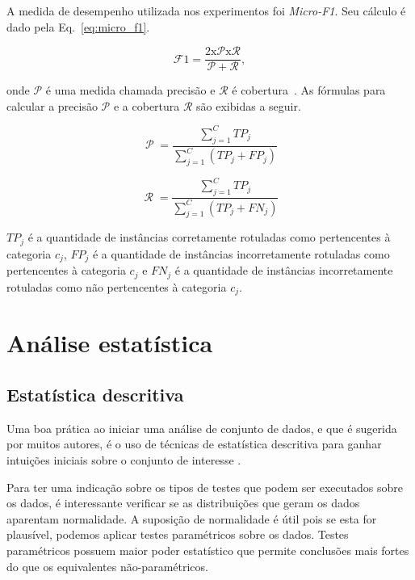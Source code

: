 \documentclass[conference]{IEEEtran}
\begin{document}
A medida de desempenho utilizada nos experimentos foi \textit{Micro-F1}.
Seu cálculo é dado pela Eq.~\ref{eq:micro_f1}.

\begin{equation}
\operatorname{\mathcal{F}{1} = \frac{2 x \mathcal{P} x \mathcal{R}}{\mathcal{P} + \mathcal{R}}},
\label{eq:micro_f1}
\end{equation}

\noindent onde $\mathcal{P}$ é uma medida chamada precisão e $\mathcal{R}$ é cobertura~\cite{chang2008multilabel}. As fórmulas para calcular a precisão $\mathcal{P}$ e a cobertura $\mathcal{R}$ são exibidas a seguir.

\begin{equation}
\operatorname{\mathcal{P}} = \frac{\sum_{j=1}^{C}TP_j}{\sum_{j=1}^{C}(TP_j + FP_j)}
\label{eq:precision}
\end{equation}

\begin{equation}
\operatorname{\mathcal{R}} = \frac{\sum_{j=1}^{C}TP_j}{\sum_{j=1}^{C}(TP_j + FN_j)}
\label{eq:recall}
\end{equation}

$TP_j$ é a quantidade de instâncias corretamente rotuladas como pertencentes à categoria $c_j$, $FP_j$ é a quantidade de instâncias incorretamente rotuladas como pertencentes à categoria $c_j$ e $FN_j$ é a quantidade de instâncias incorretamente rotuladas como não pertencentes à categoria $c_j$. 

\section{Análise estatística}
\label{sec:analise}

\subsection{Estatística descritiva}
\label{sec:estat_descr}

Uma boa prática ao iniciar uma análise de conjunto de dados, e que é sugerida por muitos autores, é o uso de técnicas de estatística descritiva para ganhar intuições iniciais sobre o conjunto de interesse \cite{montgomery2010applied}.

Para ter uma indicação sobre os tipos de testes que podem ser executados sobre os dados, é interessante verificar se as distribuições que geram os dados aparentam normalidade.
A suposição de normalidade é útil pois se esta for plausível, podemos aplicar testes paramétricos sobre os dados.
Testes paramétricos possuem maior poder estatístico que permite conclusões mais fortes do que os equivalentes não-paramétricos.
\end{document}
